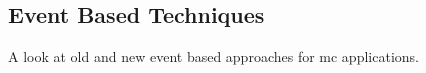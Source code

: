 \subsection{Event Based Techniques}

A look at old and new event based approaches for mc applications.